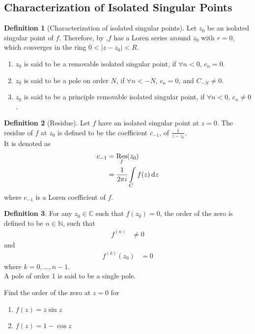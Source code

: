 \documentclass[titlepage, fleqn, a4paper, 12pt, twoside]{article}
\theoremstyle{definition}
\newtheorem{definition}{Definition}
\theoremstyle{theorem}
\DeclareMathOperator{\Res}{Res}
\begin{document}
\subsection{Characterization of Isolated Singular Points}

\begin{definition}[Characterization of isolated singular points]
	Let $z_0$ be an isolated singular point of $f$.
	Therefore, by ,$f$ has a Loren series around $z_0$ with $r = 0$, which converges in the ring $0 < |z - z_0| < R$.
	\begin{enumerate}
		\item
			$z_0$ is said to be a removable isolated singular point, if $\forall n < 0$, $c_n = 0$.
		\item
			$z_0$ is said to be a pole on order $N$, if $\forall n < -N$, $c_n = 0$, and $C_{-N} \neq 0$.
		\item
			$z_0$ is said to be a principle removable isolated singular point, if $\forall n < 0$, $c_n \neq 0$.
	\end{enumerate}
\end{definition}

\begin{definition}[Residue]
	Let $f$ have an isolated singular point at $z = 0$.
	The residue of $f$ at $z_0$ is defined to be the coefficient $c_{-1}$, of $\frac{1}{z - z_0}$.\\
	It is denoted as
	\begin{align*}
		c_{-1} & = \Res_{f}(z_0) \\
                       & = \frac{1}{2 \pi i} \int\limits_{C} f(z) \dif z
	\end{align*}
	where $c_{-1}$ is a Loren coefficient of $f$.
\end{definition}

\begin{definition}
	For any $z_0 \in \mathbb{C}$ such that $f(z_0) = 0$, the order of the zero is defined to be $n \in \mathbb{N}$, such that
	\begin{align*}
		f^{(n)} & \neq 0
	\end{align*}
	and
	\begin{align*}
		f^{(k)}(z_0) & = 0
	\end{align*}
	where $k = 0,\dots,n - 1$.\\
	A pole of order $1$ is said to be a single pole.
\end{definition}

\begin{question}
	Find the order of the zero at $z = 0$ for
	\begin{enumerate}
		\item $f(z) = z \sin z$
		\item $f(z) = 1 - \cos z$
	\end{enumerate}
\end{question}
\end{document}
